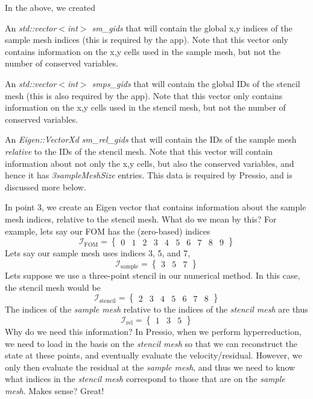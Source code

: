 In the above, we created
\begin{DoxyEnumerate}
\item An {\itshape std\+::vector$<$int$>$ sm\+\_\+gids} that will contain the global x,y indices of the sample mesh indices (this is required by the app). Note that this vector only contains information on the x,y cells used in the sample mesh, but not the number of conserved variables.
\item An {\itshape std\+::vector$<$int$>$ smps\+\_\+gids} that will contain the global I\+Ds of the stencil mesh (this is also required by the app). Note that this vector only contains information on the x,y cells used in the stencil mesh, but not the number of conserved variables. ~\newline

\item An {\itshape Eigen\+::\+Vector\+Xd sm\+\_\+rel\+\_\+gids} that will contain the I\+Ds of the sample mesh {\itshape relative} to the I\+Ds of the stencil mesh. Note that this vector will contain information about not only the x,y cells, but also the conserved variables, and hence it has {\itshape 3sample\+Mesh\+Size} entries. This data is required by Pressio, and is discussed more below.
\end{DoxyEnumerate}

In point 3, we create an Eigen vector that contains information about the sample mesh indices, relative to the stencil mesh. What do we mean by this? For example, let\textquotesingle{}s say our F\+OM has the (zero-\/based) indices \[ \mathcal{I}_{\text{FOM}} = \begin{Bmatrix} 0& 1 & 2 & 3 & 4 & 5 & 6 & 7 & 8 & 9 \end{Bmatrix}\] Let\textquotesingle{}s say our sample mesh uses indices 3, 5, and 7, \[ \mathcal{I}_{\text{sample}} = \begin{Bmatrix} 3 & 5 & 7 \end{Bmatrix}\] Let\textquotesingle{}s suppose we use a three-\/point stencil in our numerical method. In this case, the stencil mesh would be \[ \mathcal{I}_{\text{stencil}} = \begin{Bmatrix} 2& 3 & 4& 5 &6 & 7 & 8\end{Bmatrix}\] The indices of the {\itshape sample mesh} relative to the indices of the {\itshape stencil mesh} are thus \[ \mathcal{I}_{\text{rel}} =\begin{Bmatrix} 1 & 3 & 5 \end{Bmatrix}\] Why do we need this information? In Pressio, when we perform hyperreduction, we need to load in the basis on the {\itshape stencil mesh} so that we can reconstruct the state at these points, and eventually evaluate the velocity/residual. However, we only then evaluate the residual at the {\itshape sample mesh}, and thus we need to know what indices in the {\itshape stencil mesh} correspond to those that are on the {\itshape sample mesh}. Makes sense? Great!

